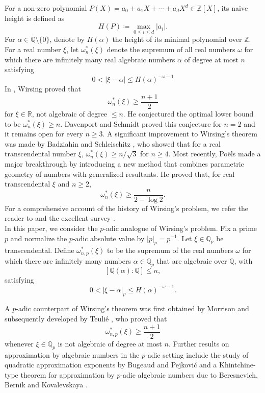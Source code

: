 \documentclass[10pt,a4paper]{amsart}
\newcommand{\Q}{\mathbb Q}
\newcommand{\Z}{\mathbb Z}
\newcommand{\R}{\mathbb R}
\newcommand{\Qp}{\mathbb Q_p}
\begin{document}
For a non-zero polynomial $P(X)=a_0+a_1X+\cdots+a_dX^d\in\Z[X]$, its naive height is defined as
\begin{equation*}
    H(P)\coloneqq\max_{0\leq i\leq d}|a_i|.
\end{equation*}
For $\alpha \in \overline{\Q}\setminus \{0\}$, denote by $H(\alpha)$ the height of its minimal polynomial over $\Z$. For a real number $\xi$, let $\omega_n^*(\xi)$ denote the
supremum of all real numbers $\omega$ for which there are infinitely many real algebraic numbers $\alpha$ of degree at most $n$ satisfying
$$
0<|\xi-\alpha|\leq H(\alpha)^{-\omega-1}
$$
In \cite{Wirsing}, Wirsing proved that
$$
\omega_n^*(\xi)\geq\frac{n+1}{2}
$$
for $\xi\in\R$, not algebraic of degree $\leq n$. He conjectured the optimal lower bound to be $\omega_n^*(\xi)\geq n$. Davenport and Schmidt \cite{DavenportSchmidt} proved this conjecture for $n=2$ and it
remains open for every $n\geq3$. A significant improvement to Wirsing's theorem was made by Badziahin
and Schleischitz \cite{BadziahinSchleischitz}, who showed that for a real transcendental number $\xi$, $\omega_n^*(\xi) \geq n/\sqrt3$ for $n\geq4$. Most recently, Po\"els
\cite{PoelsWirsing} made a major breakthrough by introducing a new method that combines parametric geometry of numbers with generalized resultants. He proved that, for real transcendental $\xi$ and $n\geq2$,
\begin{equation}\label{eq:poels-bound}
\omega_n^*(\xi)\geq\frac{n}{2-\log2}.
\end{equation}
For a comprehensive account of the history of Wirsing's problem, we refer the reader to
\cite{BugeaudBook} and the excellent survey \cite{BugeaudSurvey}.\\

In this paper, we consider the $p$-adic analogue of Wirsing's problem. Fix a prime $p$ and normalize the $p$-adic absolute value by $|p|_p=p^{-1}$. Let $\xi\in\Qp$ be transcendental. Define $\omega^*_{n,p}(\xi)$ to be the
supremum of the real numbers $\omega$ for which there are infinitely many numbers $\alpha \in \Qp$ that are algebraic over $\Q$, with
$$
[\Q(\alpha):\Q]\leq n,
$$
satisfying
$$
0<|\xi-\alpha|_p\leq H(\alpha)^{-\omega-1}.
$$

\noindent
A $p$-adic counterpart of Wirsing's theorem was first obtained by Morrison \cite{Morrison} and subsequently developed by Teuli\'e \cite{Teulie}, who proved that
\begin{equation}\label{eq:morrison-bound}
\omega^*_{n,p}(\xi)\geq\frac{n+1}{2}
\end{equation}
whenever $\xi\in\Qp$ is not algebraic of degree at most $n$. Further results on approximation by algebraic numbers in the $p$-adic setting include the study of quadratic approximation exponents by Bugeaud and Pejkovi\'c \cite{BugeaudPejkovic} and a Khintchine-type theorem
for approximation by $p$-adic algebraic numbers due to Beresnevich, Bernik and Kovalevskaya \cite{BeresnevichBernikKovalevskaya}.\\
\end{document}
